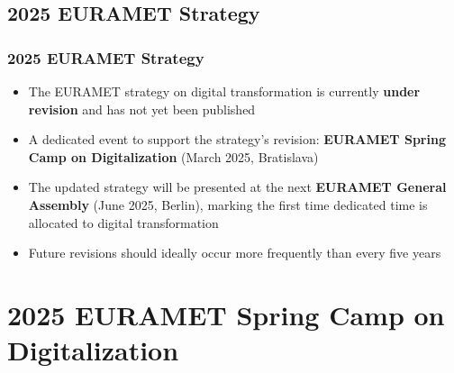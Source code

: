 \documentclass{beamer}
\begin{document}
    \subsection{2025 EURAMET Strategy}

    \begin{frame}
        \frametitle{2025 EURAMET Strategy}
        \begin{itemize}
            \item The EURAMET strategy on digital transformation is currently \textbf{under revision} and has not yet been published
            \item A dedicated event to support the strategy's revision: \textbf{EURAMET Spring Camp on Digitalization} (March 2025, Bratislava)
            \item The updated strategy will be presented at the next \textbf{EURAMET General Assembly} (June 2025, Berlin), marking the first time dedicated time is allocated to digital transformation
            \item Future revisions should ideally occur more frequently than every five years
        \end{itemize}
    \end{frame}


    \section{2025 EURAMET Spring Camp on Digitalization}
\end{document}
